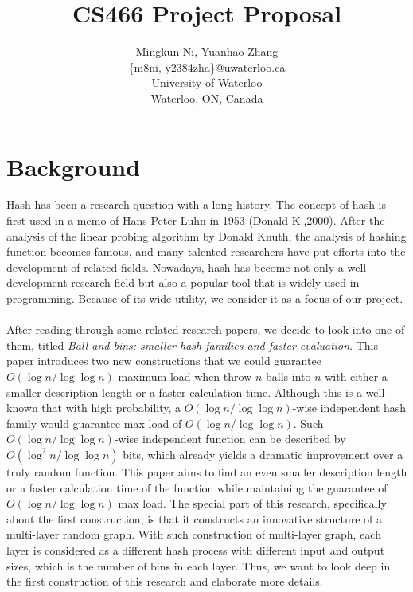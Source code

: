 \documentclass[letterpaper]{article} %
\begin{document}
	\title{CS466 Project Proposal}
	\author{Mingkun Ni, Yuanhao Zhang\\
		\{m8ni, y2384zha\}@uwaterloo.ca\\
		University of Waterloo\\
		Waterloo, ON, Canada\\
	}
	\maketitle
		
	\section{Background}
	Hash has been a research question with a long history. The concept of hash is first used in a memo of Hans Peter Luhn in 1953 (Donald K.,2000). After the analysis of the linear probing algorithm by Donald Knuth, the analysis of hashing function becomes famous, and many talented researchers have put efforts into the development of related fields. Nowadays, hash has become not only a well-development research field but also a popular tool that is widely used in programming. Because of its wide utility, we consider it as a focus of our project.\\\\
	\quad After reading through some related research papers, we decide to look into one of them, titled \textit{Ball and bins: smaller hash families and faster evaluation}. This paper introduces two new constructions that we could guarantee $O(\log n/\log\log n)$ maximum load when throw $n$ balls into $n$ with either a smaller description length or a faster calculation time. Although this is a well-known that with high probability, a $O(\log n/\log\log n)$-wise independent hash family would guarantee max load of $O(\log n/\log\log n)$. Such $O(\log n/\log\log n)$-wise independent function can be described by $O(\log^2 n/\log\log n)$ bits, which already yields a dramatic improvement over a truly random function. This paper aims to find an even smaller description length or a faster calculation time of the function while maintaining the guarantee of $O(\log n/\log\log n)$ max load. The special part of this research, specifically about the first construction, is that it constructs an innovative structure of a multi-layer random graph. With such construction of multi-layer graph, each layer is considered as a different hash process with different input and output sizes, which is the number of bins in each layer. Thus, we want to look deep in the first construction of this research and elaborate more details.
	
\end{document}
